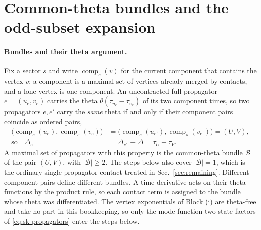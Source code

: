 \documentclass[11pt,a4paper]{article}
\numberwithin{table}{section}
\newcommand{\cB}{\mathcal B}
\begin{document}
\appendix

\section{Common-theta bundles and the odd-subset expansion}
\label{app:theta}

\paragraph{Bundles and their theta argument.}
Fix a sector $s$ and write $\operatorname{comp}_s(v)$ for the current component that contains the
vertex $v$; a component is a maximal set of vertices already merged by contacts, and a lone vertex
is one component. An uncontracted full propagator $e=(u_e,v_e)$ carries the theta
$\theta(\tau_{u_e}-\tau_{v_e})$ of its two component times, so two propagators $e,e'$ carry the
\emph{same} theta if and only if their component pairs coincide as ordered pairs,
\begin{equation}
  \begin{aligned}
  \bigl(\operatorname{comp}_s(u_e),\operatorname{comp}_s(v_e)\bigr)
  &=\bigl(\operatorname{comp}_s(u_{e'}),\operatorname{comp}_s(v_{e'})\bigr)=(U,V),\\
  \text{so}\quad \Delta_e&=\Delta_{e'}\equiv\Delta=\tau_U-\tau_V .
  \end{aligned}
  \label{eq:bundle-criterion}
\end{equation}
A maximal set of propagators with this property is the common-theta bundle $\cB$ of the pair $(U,V)$, with
$|\cB|\ge2$. The steps below also cover $|\cB|=1$, which is the ordinary single-propagator contact
treated in Sec.~\ref{sec:remaining}. Different component pairs define different bundles.
A time derivative acts on their theta functions by the product rule, so each contact term
is assigned to the bundle whose theta was differentiated. The vertex exponentials of Block (i) are
theta-free and take no part in this bookkeeping, so only the mode-function two-state factors of \eqref{eq:sk-propagators} enter the steps below.
\end{document}

